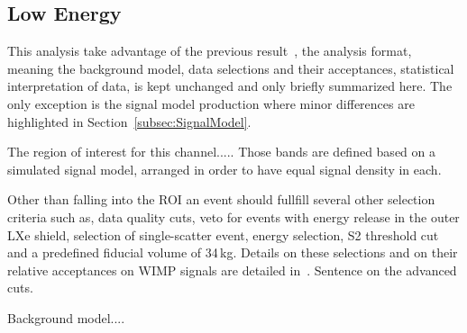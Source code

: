 
\subsection{Low Energy}
\label{subsec:LowE}
This analysis take advantage of the previous result~\cite{}, the analysis format, meaning the background model, data selections and their acceptances, 
statistical interpretation of data, is kept unchanged and only briefly summarized here. The only exception is the signal model production where 
minor differences are highlighted in Section~\ref{subsec:SignalModel}.

The region of interest for this channel.....
Those bands are defined based on a simulated signal model, arranged in order to have equal signal density in each.

Other than falling into the ROI an event should fullfill several other selection criteria such as, data quality cuts,
veto for events with energy release in the outer LXe shield, selection of single-scatter event, energy selection, S2 threshold cut and 
a predefined fiducial volume of 34\,kg. Details on these selections and on their relative acceptances on WIMP signals are detailed in~\cite{Aprile:2012vw}. 
Sentence on the advanced cuts.

Background model....


